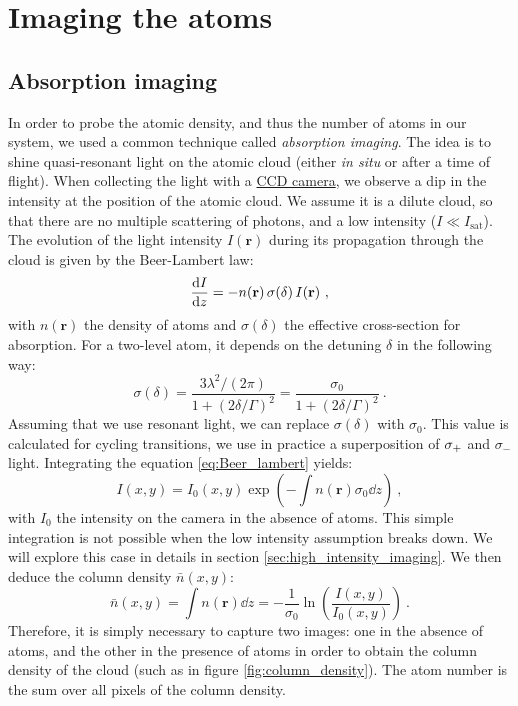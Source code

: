 \documentclass[11pt]{article}
\numberwithin{equation}{section}
\numberwithin{figure}{section}
\begin{document}
\newpage

\appendix	

\section{Imaging the atoms}
\label{sec:imaging}

\subsection{Absorption imaging}

In order to probe the atomic density, and thus the number of atoms in our system, we used a common technique called \emph{absorption imaging}. The idea is to shine quasi-resonant light on the atomic cloud (either \textit{in situ} or after a time of flight). When collecting the light with a \href{https://www.alliedvision.com/en/camera-selector/detail/mako/g-234/}{CCD camera}, we observe a dip in the intensity at the position of the atomic cloud. We assume it is a dilute cloud, so that there are no multiple scattering of photons, and a low intensity ($I \ll I_\text{sat}$). The evolution of the light intensity $I(\mathbf{r})$ during its propagation through the cloud is given by the Beer-Lambert law:
%
\begin{equation}
	\label{eq:Beer_lambert}
	\dv{I}{z}(\mathbf{r}) = - n(\mathbf{r}) \, \sigma(\delta) \, I(\mathbf{r})~,
\end{equation}
%
with $n(\mathbf{r})$ the density of atoms and $\sigma(\delta)$ the effective cross-section for absorption. For a two-level atom, it depends on the detuning $\delta$ in the following way:
%
\begin{equation}
	\sigma(\delta) = \frac{3 \lambda^2 / (2 \pi)}{1 + (2\delta / \Gamma)^2} = \frac{\sigma_0}{1 + (2\delta / \Gamma)^2}~.
\end{equation}
%
Assuming that we use resonant light, we can replace $\sigma(\delta)$ with $\sigma_0$. This value is calculated for cycling transitions, we use in practice a superposition of $\si\sigma_+$ and $\sigma_-$ light. Integrating the equation \eqref{eq:Beer_lambert} yields:
%
\begin{equation}
	I(x, y) = I_0(x, y) \exp(- \int n(\mathbf{r}) \sigma_0 \dd{z})~,
\end{equation}
%
 with $I_0$ the intensity on the camera in the absence of atoms. This simple integration is not possible when the low intensity assumption breaks down. We will explore this case in details in section \ref{sec:high_intensity_imaging}. We then deduce the column density $\bar{n}(x, y)$:
 \begin{equation}
 	\bar{n}(x, y) = \int n(\mathbf{r}) \dd{z} = - \frac{1}{\sigma_0} \ln(\frac{I(x, y)}{I_0(x,y)})~.
 \end{equation}
Therefore, it is simply necessary to capture two images: one in the absence of atoms, and the other in the presence of atoms in order to obtain the column density of the cloud (such as in figure \ref{fig:column_density}). The atom number is the sum over all pixels of the column density.
 
\end{document}

